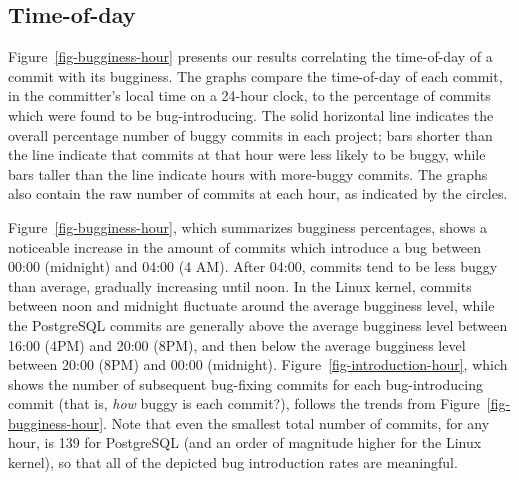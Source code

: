 \subsection{Time-of-day} 
\label{sec-time-of-day}

Figure~\ref{fig-bugginess-hour} presents our results correlating the time-of-day
of a commit with its bugginess. The graphs compare the time-of-day of each
commit, in the committer's local time on a 24-hour clock, to the percentage of
commits which were found to be bug-introducing. The solid horizontal line
indicates the overall percentage number of buggy commits in each project; bars
shorter than the line indicate that commits at that hour were less likely to be
buggy, while bars taller than the line indicate hours with more-buggy
commits. The graphs also contain the raw number of commits at each hour, as
indicated by the circles.


Figure~\ref{fig-bugginess-hour}, which summarizes bugginess percentages, shows a
noticeable increase in the amount of commits which introduce a bug between 00:00
(midnight) and 04:00 (4 AM). After 04:00, commits tend to be less buggy than
average, gradually increasing until noon. In the Linux kernel, commits between
noon and midnight fluctuate around the average bugginess level, while the
PostgreSQL commits are generally above the average bugginess level between 16:00
(4PM) and 20:00 (8PM), and then below the average bugginess level between 20:00
(8PM) and 00:00 (midnight). Figure~\ref{fig-introduction-hour}, which shows the
number of subsequent bug-fixing commits for each bug-introducing commit (that
is, {\em how} buggy is each commit?), follows the trends from
Figure~\ref{fig-bugginess-hour}. Note that even the smallest total number of
commits, for any hour, is 139 for PostgreSQL (and an order of magnitude higher
for the Linux kernel), so that all of the depicted bug introduction rates are
meaningful.

